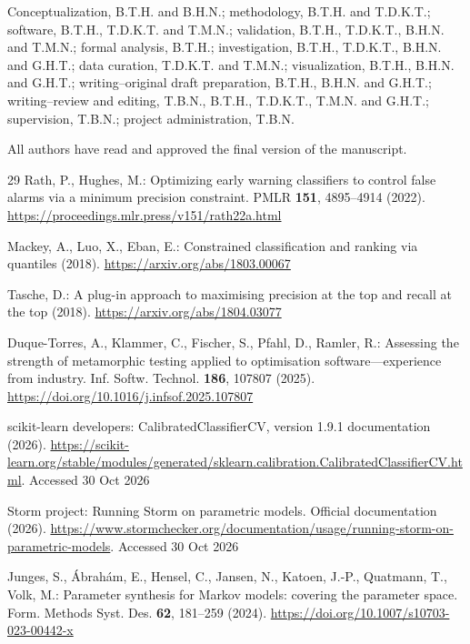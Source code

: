 \documentclass[11pt,a4paper]{article}
\begin{document}
Conceptualization, B.T.H. and B.H.N.;
methodology, B.T.H. and T.D.K.T.;
software, B.T.H., T.D.K.T. and T.M.N.;
validation, B.T.H., T.D.K.T., B.H.N. and T.M.N.;
formal analysis, B.T.H.;
investigation, B.T.H., T.D.K.T., B.H.N. and G.H.T.;
data curation, T.D.K.T. and T.M.N.;
visualization, B.T.H., B.H.N. and G.H.T.;
writing--original draft preparation, B.T.H., B.H.N. and G.H.T.;
writing--review and editing, T.B.N., B.T.H., T.D.K.T., T.M.N. and G.H.T.;
supervision, T.B.N.;
project administration, T.B.N.

All authors have read and approved the final version of the manuscript.

\begin{thebibliography}{29}
Rath, P., Hughes, M.: Optimizing early warning classifiers to control false alarms via a minimum precision constraint. PMLR \textbf{151}, 4895--4914 (2022). \url{https://proceedings.mlr.press/v151/rath22a.html}

Mackey, A., Luo, X., Eban, E.: Constrained classification and ranking via quantiles (2018). \url{https://arxiv.org/abs/1803.00067}

Tasche, D.: A plug-in approach to maximising precision at the top and recall at the top (2018). \url{https://arxiv.org/abs/1804.03077}

Duque-Torres, A., Klammer, C., Fischer, S., Pfahl, D., Ramler, R.: Assessing the strength of metamorphic testing applied to optimisation software---experience from industry. Inf. Softw. Technol. \textbf{186}, 107807 (2025). \url{https://doi.org/10.1016/j.infsof.2025.107807}

scikit-learn developers: CalibratedClassifierCV, version 1.9.1 documentation (2026). \url{https://scikit-learn.org/stable/modules/generated/sklearn.calibration.CalibratedClassifierCV.html}. Accessed 30 Oct 2026

Storm project: Running Storm on parametric models. Official documentation (2026). \url{https://www.stormchecker.org/documentation/usage/running-storm-on-parametric-models}. Accessed 30 Oct 2026

Junges, S., \'{A}brah\'{a}m, E., Hensel, C., Jansen, N., Katoen, J.-P., Quatmann, T., Volk, M.: Parameter synthesis for Markov models: covering the parameter space. Form. Methods Syst. Des. \textbf{62}, 181--259 (2024). \url{https://doi.org/10.1007/s10703-023-00442-x}


\end{thebibliography}
\end{document}
